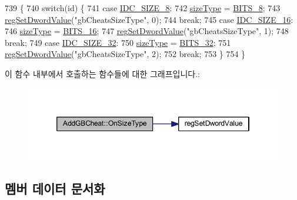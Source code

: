 \begin{DoxyCode}
739 \{
740   \textcolor{keywordflow}{switch}(\textcolor{keywordtype}{id}) \{
741   \textcolor{keywordflow}{case} \mbox{\hyperlink{resource_8h_aabec7e8ec4648288db9ff8c10fdf3bb7}{IDC\_SIZE\_8}}:
742     \mbox{\hyperlink{class_add_g_b_cheat_ae0603ce2570d5b09a64f4bd6c2107962}{sizeType}} = \mbox{\hyperlink{_cheat_search_8h_adf764cbdea00d65edcd07bb9953ad2b7af0816abbef0501e93cc698ee906d1fcc}{BITS\_8}};
743     \mbox{\hyperlink{_reg_8cpp_a758e775489a3fb5c3cc7071fdd5af87e}{regSetDwordValue}}(\textcolor{stringliteral}{"gbCheatsSizeType"}, 0);
744     \textcolor{keywordflow}{break};
745   \textcolor{keywordflow}{case} \mbox{\hyperlink{resource_8h_a3b1ce25b145995e8af592b0a80b8e564}{IDC\_SIZE\_16}}:
746     \mbox{\hyperlink{class_add_g_b_cheat_ae0603ce2570d5b09a64f4bd6c2107962}{sizeType}} = \mbox{\hyperlink{_cheat_search_8h_adf764cbdea00d65edcd07bb9953ad2b7abb0eee326b181eb02d5c284fc424ffeb}{BITS\_16}};
747     \mbox{\hyperlink{_reg_8cpp_a758e775489a3fb5c3cc7071fdd5af87e}{regSetDwordValue}}(\textcolor{stringliteral}{"gbCheatsSizeType"}, 1);
748     \textcolor{keywordflow}{break};
749   \textcolor{keywordflow}{case} \mbox{\hyperlink{resource_8h_a2d7fa8cb0d3104b26a76be5ab586ff5a}{IDC\_SIZE\_32}}:
750     \mbox{\hyperlink{class_add_g_b_cheat_ae0603ce2570d5b09a64f4bd6c2107962}{sizeType}} = \mbox{\hyperlink{_cheat_search_8h_adf764cbdea00d65edcd07bb9953ad2b7aa9302713d54f2f027fa92a747c80c91a}{BITS\_32}};
751     \mbox{\hyperlink{_reg_8cpp_a758e775489a3fb5c3cc7071fdd5af87e}{regSetDwordValue}}(\textcolor{stringliteral}{"gbCheatsSizeType"}, 2);
752     \textcolor{keywordflow}{break};
753   \}
754 \}
\end{DoxyCode}
이 함수 내부에서 호출하는 함수들에 대한 그래프입니다.\+:
\nopagebreak
\begin{figure}[H]
\begin{center}
\leavevmode
\includegraphics[width=346pt]{class_add_g_b_cheat_a9bff22f01c72ffbcd6071bb604c2e090_cgraph}
\end{center}
\end{figure}


\subsection{멤버 데이터 문서화}
\mbox{\label{class_add_g_b_cheat_adb910488c84e165b4fd33646b932ee2e}} 
